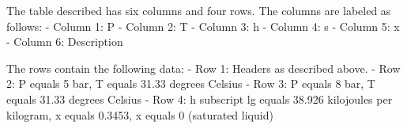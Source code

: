 The table described has six columns and four rows. The columns are labeled as follows:
- Column 1: P
- Column 2: T
- Column 3: h
- Column 4: s
- Column 5: x
- Column 6: Description

The rows contain the following data:
- Row 1: Headers as described above.
- Row 2: P equals 5 bar, T equals 31.33 degrees Celsius
- Row 3: P equals 8 bar, T equals 31.33 degrees Celsius
- Row 4: h subscript lg equals 38.926 kilojoules per kilogram, x equals 0.3453, x equals 0 (saturated liquid)